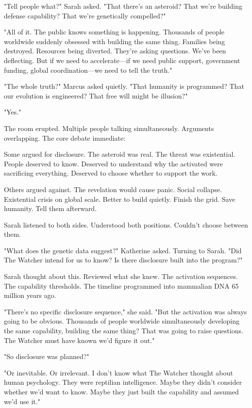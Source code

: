 "Tell people what?" Sarah asked. "That there's an asteroid? That we're building defense capability? That we're genetically compelled?"

"All of it. The public knows something is happening. Thousands of people worldwide suddenly obsessed with building the same thing. Families being destroyed. Resources being diverted. They're asking questions. We've been deflecting. But if we need to accelerate—if we need public support, government funding, global coordination—we need to tell the truth."

"The whole truth?" Marcus asked quietly. "That humanity is programmed? That our evolution is engineered? That free will might be illusion?"

"Yes."

The room erupted. Multiple people talking simultaneously. Arguments overlapping. The core debate immediate:

Some argued for disclosure. The asteroid was real. The threat was existential. People deserved to know. Deserved to understand why the activated were sacrificing everything. Deserved to choose whether to support the work.

Others argued against. The revelation would cause panic. Social collapse. Existential crisis on global scale. Better to build quietly. Finish the grid. Save humanity. Tell them afterward.

Sarah listened to both sides. Understood both positions. Couldn't choose between them.

"What does the genetic data suggest?" Katherine asked. Turning to Sarah. "Did The Watcher intend for us to know? Is there disclosure built into the program?"

Sarah thought about this. Reviewed what she knew. The activation sequences. The capability thresholds. The timeline programmed into mammalian DNA 65 million years ago.

"There's no specific disclosure sequence," she said. "But the activation was always going to be obvious. Thousands of people worldwide simultaneously developing the same capability, building the same thing? That was going to raise questions. The Watcher must have known we'd figure it out."

"So disclosure was planned?"

"Or inevitable. Or irrelevant. I don't know what The Watcher thought about human psychology. They were reptilian intelligence. Maybe they didn't consider whether we'd want to know. Maybe they just built the capability and assumed we'd use it."

